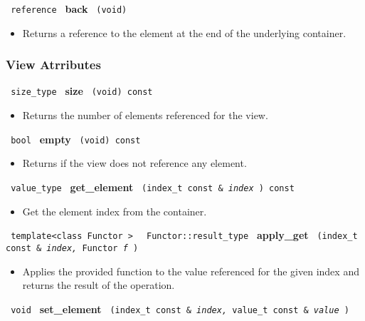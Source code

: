 \noindent
\texttt{%
reference
}
\newline
\textbf{back}%
\texttt{%
(void)
}

\begin{itemize}
\item
Returns a reference to the element at the end of the underlying container.
\end{itemize}

\subsubsection{View Atrributes}

\noindent
\texttt{%
size\_type
}
\newline
\textbf{size}%
\texttt{%
(void) const
}

\begin{itemize}
\item
Returns the number of elements referenced for the view.
\end{itemize}

\noindent
\texttt{%
bool
}
\newline
\textbf{empty}%
\texttt{%
(void) const
}

\begin{itemize}
\item
Returns if the view does not reference any element.
\end{itemize}

\noindent
\texttt{%
value\_type
}
\newline
\textbf{get\_element}%
\texttt{%
(index\_t const \&
\textit{index}%
) const
}

\begin{itemize}
\item
Get the element index from the container.
\end{itemize}

\noindent
\texttt{%
template<class Functor >
}
\texttt{%
Functor::result\_type
}
\newline
\textbf{apply\_get}%
\texttt{%
(index\_t const \&
\textit{index,}%
Functor
\textit{f}%
)
}

\begin{itemize}
\item
Applies the provided function to the value referenced for the given index and returns the result of the operation.
\end{itemize}

\noindent
\texttt{%
void
}
\newline
\textbf{set\_element}%
\texttt{%
(index\_t const \&
\textit{index,}%
value\_t const \&
\textit{value}%
)
}

